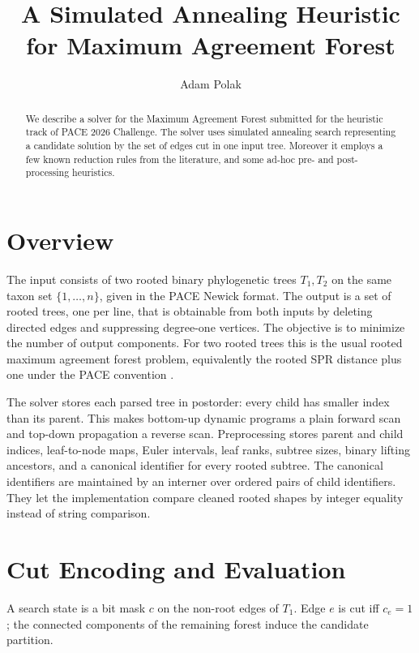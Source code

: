 \documentclass[a4paper,UKenglish,cleveref,autoref]{lipics-v2021}
\title{A Simulated Annealing Heuristic for Maximum Agreement Forest}
\author{Adam Polak}{Bocconi University}{adam.polak@unibocconi.it}{}{}
\begin{document}
\maketitle

\begin{abstract}
We describe a solver for the Maximum Agreement Forest submitted for
the heuristic track of PACE 2026 Challenge.
The solver uses simulated annealing search representing a candidate solution by
the set of edges cut in one input tree.
Moreover it employs a few known reduction rules from the literature,
and some ad-hoc pre- and post-processing heuristics.
\end{abstract}

\section{Overview}

The input consists of two rooted binary phylogenetic trees \(T_1,T_2\) on the
same taxon set \(\{1,\ldots,n\}\), given in the PACE Newick format.  The output
is a set of rooted trees, one per line, that is obtainable from both inputs by
deleting directed edges and suppressing degree-one vertices.  The objective is
to minimize the number of output components.  For two rooted trees this is the
usual rooted maximum agreement forest problem, equivalently the rooted SPR
distance plus one under the PACE convention \cite{pace2026maf,bordewich2005}.

The solver stores each parsed tree in postorder: every child has smaller index
than its parent.  This makes bottom-up dynamic programs a plain forward scan and
top-down propagation a reverse scan.  Preprocessing stores parent and child
indices, leaf-to-node maps, Euler intervals, leaf ranks, subtree sizes, binary
lifting ancestors, and a canonical identifier for every rooted subtree.  The
canonical identifiers are maintained by an interner over ordered pairs of child
identifiers.  They let the implementation compare cleaned rooted shapes by
integer equality instead of string comparison.

\section{Cut Encoding and Evaluation}

A search state is a bit mask \(c\) on the non-root edges of \(T_1\).  Edge
\(e\) is cut iff \(c_e=1\); the connected components of the remaining forest
induce the candidate partition.
\end{document}
